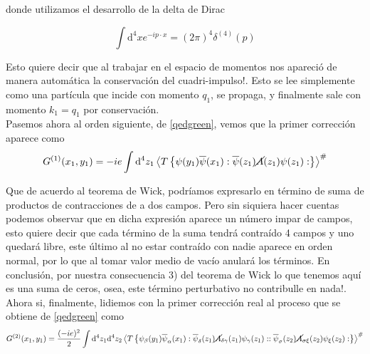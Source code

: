 \documentclass{article}
\numberwithin{equation}{section}
\begin{document}
donde utilizamos el desarrollo de la delta de Dirac

\begin{equation}\label{key}
\int \mathrm{d^4}x e^{-ip \cdot x} = \left(2 \pi\right)^4 \delta^{(4)}(p)
\end{equation}

Esto quiere decir que al trabajar en el espacio de momentos nos apareció de
manera automática la conservación del cuadri-impulso!. Esto se lee
simplemente como una partícula que incide con momento $q_{1}$,
se propaga, y finalmente sale con momento $ k_1=q_1 $ por conservación.\\

Pasemos ahora al orden siguiente,
de \ref{qedgreen}, vemos que la primer corrección aparece como
\begin{equation}
G^{(1)}(x_{1},y_{1})=-ie\int \mathrm{d^4}z_{1}\left\langle T\left\{ \psi(y_{1})\overline{\psi}(x_{1}):\overline{\psi}(z_{1})\cancel{A}(z_{1})\psi(z_{1}):\right\} \right\rangle ^{\#}
\end{equation}

Que de acuerdo al teorema de Wick, podríamos expresarlo en término
de suma de productos de contracciones de a dos campos. Pero sin siquiera
hacer cuentas podemos observar que en dicha expresión aparece un número
impar de campos, esto quiere decir que cada término de la suma tendrá
contraído 4 campos y uno quedará libre, este último al no estar contraído
con nadie aparece en orden normal, por lo que al tomar valor medio
de vacío anulará los términos. En conclusión, por nuestra consecuencia
3) del teorema de Wick lo que tenemos aquí es una suma de ceros, osea,
este término perturbativo no contribulle en nada!.\\

Ahora si, finalmente,
lidiemos con la primer corrección real al proceso que se obtiene de \ref{qedgreen} como
\begin{equation}\label{g2}
G^{(2)}(x_{1},y_{1})=\frac{(-ie)^{2}}{2}\int \mathrm{d^4}z_{1}\mathrm{d^4}z_{2}\left\langle T\left\{ \psi_{\beta}(y_{1})\overline{\psi}_{\alpha}(x_{1}):\overline{\psi}_{\delta}(z_{1})\cancel{A}_{\delta\gamma}(z_{1})\psi_{\gamma}(z_{1})::\overline{\psi}_{\sigma}(z_{2})\cancel{A}_{\sigma\xi}(z_{2})\psi_{\xi}(z_{2}):\right\} \right\rangle ^{\#}
\end{equation}
\end{document}
